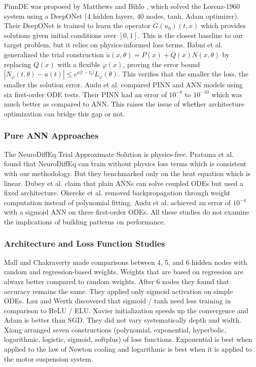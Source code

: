 PinnDE was proposed by Matthews and Bihlo \cite{matthews2024pinnde}, which solved the Lorenz-1960 system using a DeepONet (4 hidden layers, 40 nodes, tanh, Adam optimizer). Their DeepONet is trained to learn the operator $G(u_0)(t, x)$ which provides solutions given initial conditions over $[0, 1]$. This is the closest baseline to our target problem, but it relies on physics-informed loss terms. Babni et al. \cite{babni2025error} generalized the trial construction $\tilde{u}(x, \theta) = P(x) + Q(x)N(x, \theta)$ by replacing $Q(x)$ with a flexible $\varphi(x)$, proving the error bound $|N_\varphi(t, \theta) - u(t)| \leq e^{\kappa|t - t_0|} L_\varphi(\theta)$. This verifies that the smaller the loss, the smaller the solution error. Audu et al. \cite{audu2026neural} compared PINN and ANN models using six first-order ODE tests. Their PINN had an error of $10^{-8}$ to $10^{-10}$ which was much better as compared to ANN. This raises the issue of whether architecture optimization can bridge this gap or not.

\subsubsection{Pure ANN Approaches}

The NeuroDiffEq Trial Approximate Solution is physics-free. Pratama et al. \cite{pratama2022ann} found that NeuroDiffEq can train without physics loss terms which is consistent with our methodology. But they benchmarked only on the heat equation which is linear. Dubey et al. \cite{dubey2024solving} claim that plain ANNs can solve coupled ODEs but used a fixed architecture. Okereke et al. \cite{okereke2021novel} removed backpropagation through weight computation instead of polynomial fitting. Audu et al. \cite{audu2024utilizing} achieved an error of $10^{-4}$ with a sigmoid ANN on three first-order ODEs. All these studies do not examine the implications of building patterns on performance.

\subsubsection{Architecture and Loss Function Studies}

Mall and Chakraverty \cite{mall2013comparison} made comparisons between 4, 5, and 6 hidden nodes with random and regression-based weights. Weights that are based on regression are always better compared to random weights. After 6 nodes they found that accuracy remains the same. They applied only sigmoid activation on simple ODEs. Lau and Werth \cite{lau2020oden} discovered that sigmoid / tanh need less training in comparison to ReLU / ELU. Xavier initialization speeds up the convergence and Adam is better than SGD. They did not vary systematically depth and width. Xiong \cite{xiong2022new} arranged seven constructions (polynomial, exponential, hyperbolic, logarithmic, logistic, sigmoid, softplus) of loss functions. Exponential is best when applied to the law of Newton cooling and logarithmic is best when it is applied to the motor suspension system.

